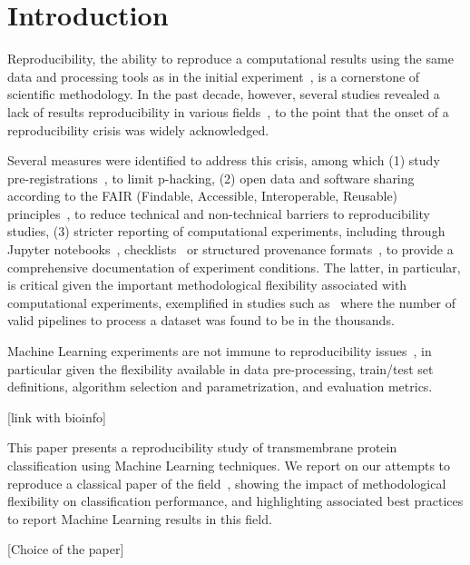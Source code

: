 \section {Introduction}


Reproducibility, the ability to reproduce a computational results using the
same data and processing tools as in the initial experiment~\cite{peng}, is
a cornerstone of scientific methodology. In the past decade, however,
several studies revealed a lack of results reproducibility in various
fields~\cite{xxx, narps}, to the point that the onset of a reproducibility crisis
was widely acknowledged. 

Several measures were identified to address this crisis, among which (1)
study pre-registrations~\cite{cortexguy}, to limit  p-hacking, (2) open
data and software sharing according to the FAIR (Findable, Accessible,
Interoperable, Reusable) principles~\cite{fair,stodden}, to reduce
technical and non-technical barriers to reproducibility studies, (3)
stricter reporting of computational experiments, including through Jupyter
notebooks~\cite{xxx}, checklists~\cite{cobidas, pineau} or structured
provenance formats~\cite{xxx}, to provide a comprehensive documentation of
experiment conditions. The latter, in particular, is critical given the
important methodological flexibility associated with computational
experiments, exemplified in studies such as~\cite{carp} where the number of
valid pipelines to process a dataset was found to be in the thousands.

Machine Learning experiments are not immune to reproducibility
issues~\cite{overview}, in particular given the flexibility available in
data pre-processing, train/test set definitions, algorithm selection and
parametrization, and evaluation metrics. 

[link with bioinfo]

This paper presents a reproducibility study of transmembrane protein
classification using Machine Learning techniques. We report on our attempts
to reproduce a classical paper of the field~\cite{ref}, showing the impact
of methodological flexibility on classification performance, and
highlighting associated best practices to report Machine Learning results
in this field.  

[Choice of the paper]


